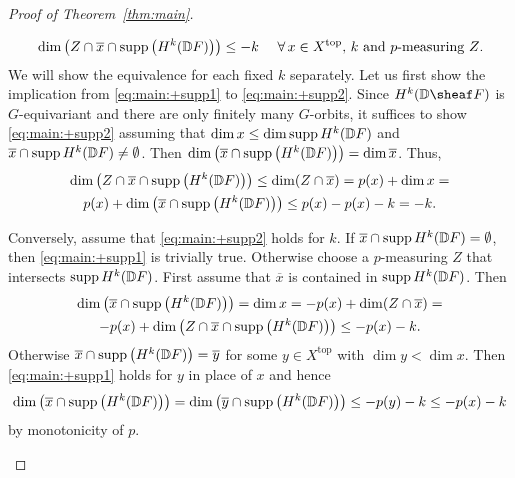\documentclass[english,biblatex-alpha,bw]{short-notes}
\newcommand\dualize{\mathbb D}
\begin{document}
\begin{proof}[Proof of Theorem~\ref{thm:main}]
\begin{enumerate}
\begin{align}
        \label{eq:main:+supp2}%
        & \dim\left( Z \cap  \overline x \cap  \supp\left( H^k(\dualize F) \right) \right) \leq  - k & \text{ $\forall\, x \in  X^{\mathrm{top}}$, $k$ and $p$-measuring $Z$}.
    \end{align}
    We will show the equivalence for each fixed $k$ separately.
    Let us first show the implication from \eqref{eq:main:+supp1} to \eqref{eq:main:+supp2}.
    Since $H^k(\dualize \sheaf F)$ is $G$-equivariant and there are only finitely many $G$-orbits, it suffices to show \eqref{eq:main:+supp2} assuming that $\dim x \le \dim \supp H^k(\dualize F)$ and $\overline x \cap \supp H^k(\dualize F) \ne \emptyset$.
    Then $\dim\left(\overline x \cap  \supp\left( H^k(\dualize F) \right)\right) = \dim \overline x$.
    Thus,
    \begin{multline*}
        \dim\left(Z \cap  \overline x \cap  \supp\left( H^k(\dualize F) \right) \right) \le
        \dim(Z \cap  \overline x) =
        p(x) + \dim x = \\
        p(x) + \dim\left(\overline x \cap  \supp\left( H^k(\dualize F) \right)\right) \le
        p(x) - p(x) - k
        = -k.
    \end{multline*}
    
    Conversely, assume that \eqref{eq:main:+supp2} holds for $k$.
    If $\overline x \cap \supp H^k(\dualize F) = \emptyset$, then \eqref{eq:main:+supp1} is trivially true.
    Otherwise choose a $p$-measuring $Z$ that intersects $\supp H^k(\dualize F)$.
    First assume that $\overline x$ is contained in $\supp H^k(\dualize F)$.
    Then
    \begin{multline*}
        \dim\left(\overline x \cap  \supp\left( H^k(\dualize F) \right)\right) =
        \dim x =
        -p(x) + \dim(Z \cap  \overline x) = \\
        -p(x) + \dim\left(Z \cap  \overline x \cap  \supp\left( H^k(\dualize F) \right) \right) \le
        -p(x) - k.
    \end{multline*}
    Otherwise $\overline x \cap  \supp\left( H^k(\dualize F) \right) = \overline y$ for some $y \in  X^{\mathrm{top}}$ with $\dim y < \dim x$.
    Then \eqref{eq:main:+supp1} holds for $y$ in place of $x$ and hence
    \[
    \dim\left( \overline x \cap  \supp\left( H^k(\dualize F) \right) \right) =
    \dim\left( \overline y \cap  \supp\left( H^k(\dualize F) \right) \right) \leq 
    -p(y) - k \leq 
    -p(x) - k
    \]
    by monotonicity of $p$.
    \qedhere
\end{enumerate}
\end{proof}
\end{document}
